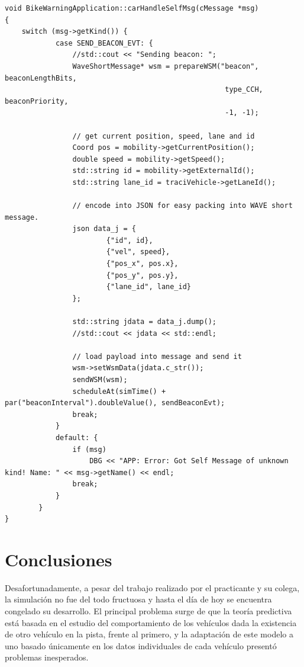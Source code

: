 \documentclass[11pt,letterpaper]{article}
\begin{document}
\noindent\begin{minipage}{\linewidth}
\begin{lstlisting}[style=CPP, caption={Código encargado de la medición periódica y envío de datos a la RSU en \emph{BikeWarningApplication}.}, label={lst:send_json}]
void BikeWarningApplication::carHandleSelfMsg(cMessage *msg)
{
    switch (msg->getKind()) {
            case SEND_BEACON_EVT: {
                //std::cout << "Sending beacon: ";
                WaveShortMessage* wsm = prepareWSM("beacon", beaconLengthBits,
													type_CCH, beaconPriority,
													-1, -1);

				// get current position, speed, lane and id
                Coord pos = mobility->getCurrentPosition();
                double speed = mobility->getSpeed();
                std::string id = mobility->getExternalId();
                std::string lane_id = traciVehicle->getLaneId();

				// encode into JSON for easy packing into WAVE short message.
                json data_j = {
                        {"id", id},
                        {"vel", speed},
                        {"pos_x", pos.x},
                        {"pos_y", pos.y},
                        {"lane_id", lane_id}
                };

                std::string jdata = data_j.dump();
                //std::cout << jdata << std::endl;

				// load payload into message and send it
                wsm->setWsmData(jdata.c_str());
                sendWSM(wsm);
                scheduleAt(simTime() + par("beaconInterval").doubleValue(), sendBeaconEvt);
                break;
            }
            default: {
                if (msg)
                    DBG << "APP: Error: Got Self Message of unknown kind! Name: " << msg->getName() << endl;
                break;
            }
        }
}
\end{lstlisting}
\end{minipage}


\newpage
\section{Conclusiones}

Desafortunadamente, a pesar del trabajo realizado por el practicante y su colega, la simulación no fue del todo fructuosa y hasta el día de hoy se encuentra congelado su desarrollo. El principal problema surge de que la teoría predictiva está basada en el estudio del comportamiento de los vehículos dada la existencia de otro vehículo en la pista, frente al primero, y la adaptación de este modelo a uno basado únicamente en los datos individuales de cada vehículo presentó problemas inesperados.
\end{document}

